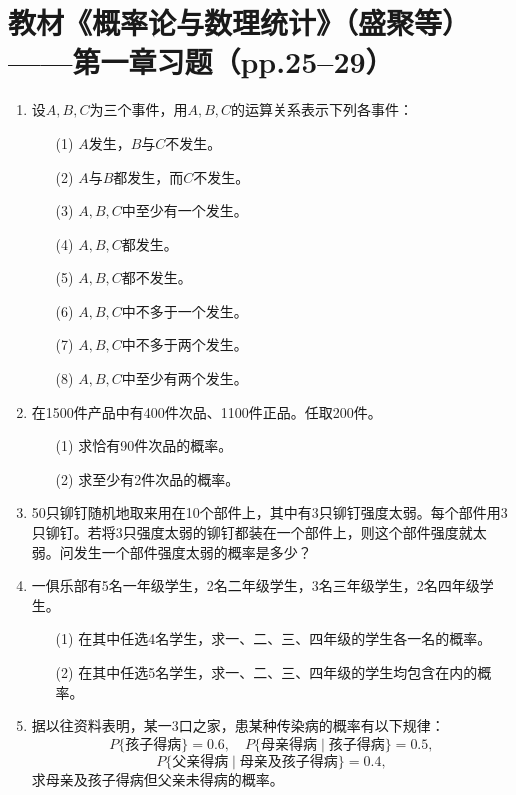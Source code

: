 \documentclass[UTF8]{ctexart}
\begin{document}
\section*{教材《概率论与数理统计》（盛聚等）——第一章习题（pp.25--29）}

\begin{enumerate}
\renewcommand{\labelenumi}{\textbf{\arabic{enumi}.}}
\setcounter{enumi}{1}
\item 设$A,B,C$为三个事件，用$A,B,C$的运算关系表示下列各事件：
\begin{enumerate}
\item[(1)] $A$发生，$B$与$C$不发生。
\item[(2)] $A$与$B$都发生，而$C$不发生。
\item[(3)] $A,B,C$中至少有一个发生。
\item[(4)] $A,B,C$都发生。
\item[(5)] $A,B,C$都不发生。
\item[(6)] $A,B,C$中不多于一个发生。
\item[(7)] $A,B,C$中不多于两个发生。
\item[(8)] $A,B,C$中至少有两个发生。
\end{enumerate}

\setcounter{enumi}{7}
\item 在1500件产品中有400件次品、1100件正品。任取200件。
\begin{enumerate}
\item[(1)] 求恰有90件次品的概率。
\item[(2)] 求至少有2件次品的概率。
\end{enumerate}

\setcounter{enumi}{11}
\item 50只铆钉随机地取来用在10个部件上，其中有3只铆钉强度太弱。每个部件用3只铆钉。若将3只强度太弱的铆钉都装在一个部件上，则这个部件强度就太弱。问发生一个部件强度太弱的概率是多少？

\item 一俱乐部有5名一年级学生，2名二年级学生，3名三年级学生，2名四年级学生。
\begin{enumerate}
\item[(1)] 在其中任选4名学生，求一、二、三、四年级的学生各一名的概率。
\item[(2)] 在其中任选5名学生，求一、二、三、四年级的学生均包含在内的概率。
\end{enumerate}

\setcounter{enumi}{15}
\item 据以往资料表明，某一3口之家，患某种传染病的概率有以下规律：
\[
P\{\text{孩子得病}\}=0.6,\quad P\{\text{母亲得病}\mid\text{孩子得病}\}=0.5,
\]
\[
P\{\text{父亲得病}\mid\text{母亲及孩子得病}\}=0.4,
\]
求母亲及孩子得病但父亲未得病的概率。


\end{enumerate}
\end{document}
